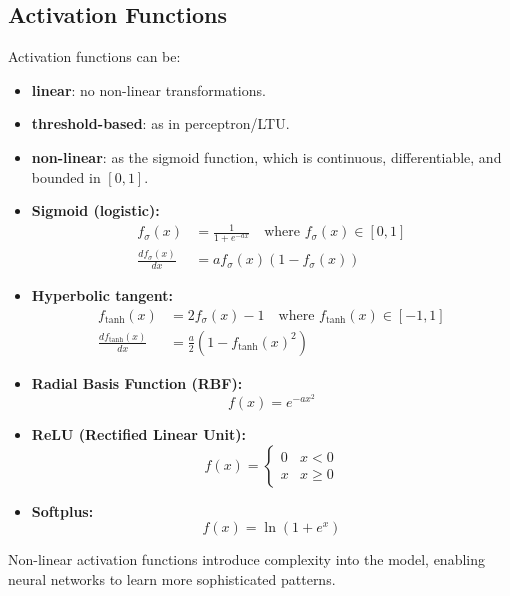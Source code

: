 \subsection{Activation Functions}
Activation functions can be:
\begin{itemize}
    \item \textbf{linear}: no non-linear transformations.
    \item \textbf{threshold-based}: as in perceptron/LTU.
    \item \textbf{non-linear}: as the sigmoid function, which is continuous, differentiable, and bounded in \([0,1]\).
\end{itemize}\begin{itemize}[leftmargin=*, nosep]
    \item \textbf{Sigmoid (logistic):}
    \begin{align}
        f_{\sigma}(x) &= \frac{1}{1+e^{-ax}} \quad \text{where } f_{\sigma}(x) \in [0,1] \\
        \frac{d f_{\sigma}(x)}{dx} &= a f_{\sigma}(x)(1 - f_{\sigma}(x))
    \end{align}
    
    \item \textbf{Hyperbolic tangent:}
    \begin{align}
        f_{\tanh}(x) &= 2f_{\sigma}(x) - 1 \quad \text{where } f_{\tanh}(x) \in [-1,1] \\
        \frac{d f_{\tanh}(x)}{dx} &= \frac{a}{2}\left(1 - f_{\tanh}(x)^2\right)
    \end{align}
    
    \item \textbf{Radial Basis Function (RBF):}
    \begin{equation}
        f(x) = e^{-ax^2}
    \end{equation}
    
    \item \textbf{ReLU (Rectified Linear Unit):}
    \begin{equation}
        f(x) =
        \begin{cases}
            0 & x < 0 \\
            x & x \geq 0
        \end{cases}
    \end{equation}
    
    \item \textbf{Softplus:}
    \begin{equation}
        f(x) = \ln(1+e^x)
    \end{equation}
\end{itemize}
Non-linear activation functions introduce complexity into the model, enabling neural networks to learn more sophisticated patterns.

